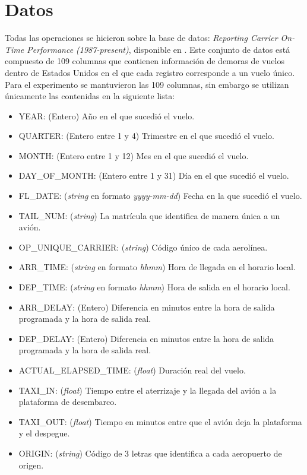 \section{Datos}

Todas las operaciones se hicieron sobre la base de datos: 
\textit{Reporting Carrier On-Time Performance (1987-present)}, disponible en \cite{linktranstat}. Este conjunto de datos está compuesto de 109 columnas que contienen información de demoras de vuelos dentro de Estados Unidos en el que cada registro corresponde a un vuelo único. Para el experimento se mantuvieron las 109 columnas, sin embargo se utilizan únicamente las contenidas en la siguiente lista:

\begin{itemize}
	\item YEAR: (Entero) Año en el que sucedió el vuelo.
	\item QUARTER: (Entero entre 1 y 4) Trimestre en el que sucedió el vuelo.
	\item MONTH: (Entero entre 1 y 12) Mes en el que sucedió el vuelo.
	\item DAY\_OF\_MONTH: (Entero entre 1 y 31) Día en el que sucedió el vuelo.
	\item FL\_DATE: (\textit{string} en formato \textit{yyyy-mm-dd}) Fecha en la que sucedió el vuelo.
	\item TAIL\_NUM: (\textit{string}) La matrícula que identifica de manera única a un avión.
	\item OP\_UNIQUE\_CARRIER: (\textit{string}) Código único de cada aerolínea.
	\item ARR\_TIME: (\textit{string} en formato \textit{hhmm}) Hora de llegada en el horario local.
	\item DEP\_TIME: (\textit{string} en formato \textit{hhmm}) Hora de salida en el horario local.
	\item ARR\_DELAY: (Entero) Diferencia en minutos entre la hora de salida programada y la hora de salida real.
	\item DEP\_DELAY: (Entero) Diferencia en minutos entre la hora de salida programada y la hora de salida real.
	\item ACTUAL\_ELAPSED\_TIME: (\textit{float}) Duración real del vuelo.
	\item TAXI\_IN: (\textit{float}) Tiempo entre el aterrizaje y la llegada del avión a la plataforma de desembarco.
	\item TAXI\_OUT: (\textit{float}) Tiempo en minutos entre que el avión deja la plataforma y el despegue.
	\item ORIGIN: (\textit{string}) Código de 3 letras que identifica a cada aeropuerto de origen.

\end{itemize}
